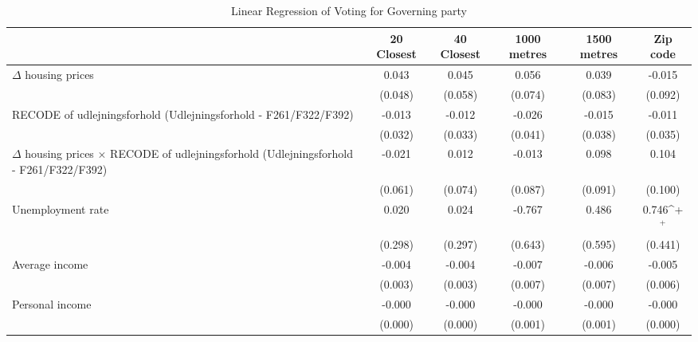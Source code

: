 \begin{table}[htbp]\centering
\def\sym#1{\ifmmode^{#1}\else\(^{#1}\)\fi}
\caption{Linear Regression of Voting for Governing party } \label{inddens}
\begin{tabular}{l*{5}{c}}
\hline\hline
                    &\multicolumn{1}{c}{20 Closest}&\multicolumn{1}{c}{40 Closest}&\multicolumn{1}{c}{1000 metres}&\multicolumn{1}{c}{1500 metres}&\multicolumn{1}{c}{Zip code}\\
\hline
$\Delta$ housing prices&       0.043       &       0.045       &       0.056       &       0.039       &      -0.015       \\
                    &     (0.048)       &     (0.058)       &     (0.074)       &     (0.083)       &     (0.092)       \\
[1em]
RECODE of udlejningsforhold (Udlejningsforhold - F261/F322/F392)&      -0.013       &      -0.012       &      -0.026       &      -0.015       &      -0.011       \\
                    &     (0.032)       &     (0.033)       &     (0.041)       &     (0.038)       &     (0.035)       \\
[1em]
$\Delta$ housing prices $\times$ RECODE of udlejningsforhold (Udlejningsforhold - F261/F322/F392)&      -0.021       &       0.012       &      -0.013       &       0.098       &       0.104       \\
                    &     (0.061)       &     (0.074)       &     (0.087)       &     (0.091)       &     (0.100)       \\
[1em]
Unemployment rate   &       0.020       &       0.024       &      -0.767       &       0.486       &       0.746\sym{+}\\
                    &     (0.298)       &     (0.297)       &     (0.643)       &     (0.595)       &     (0.441)       \\
[1em]
Average income      &      -0.004       &      -0.004       &      -0.007       &      -0.006       &      -0.005       \\
                    &     (0.003)       &     (0.003)       &     (0.007)       &     (0.007)       &     (0.006)       \\
[1em]
Personal income     &      -0.000       &      -0.000       &      -0.000       &      -0.000       &      -0.000       \\
                    &     (0.000)       &     (0.000)       &     (0.001)       &     (0.001)       &     (0.000)       \\

\end{tabular}
\end{table}
